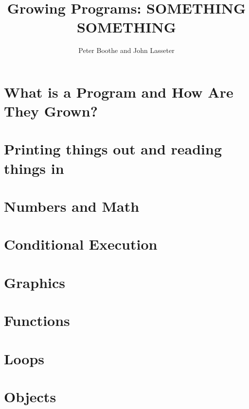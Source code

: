 \documentclass{book}
\title{Growing Programs: SOMETHING SOMETHING}
\author{Peter Boothe and John Lasseter}
\begin{document}
\maketitle
\tableofcontents
\chapter{What is a Program and How Are They Grown?}
\chapter{Printing things out and reading things in}
\chapter{Numbers and Math}
\chapter{Conditional Execution}
\chapter{Graphics}
\chapter{Functions}
\chapter{Loops}
\chapter{Objects}
\end{document}
